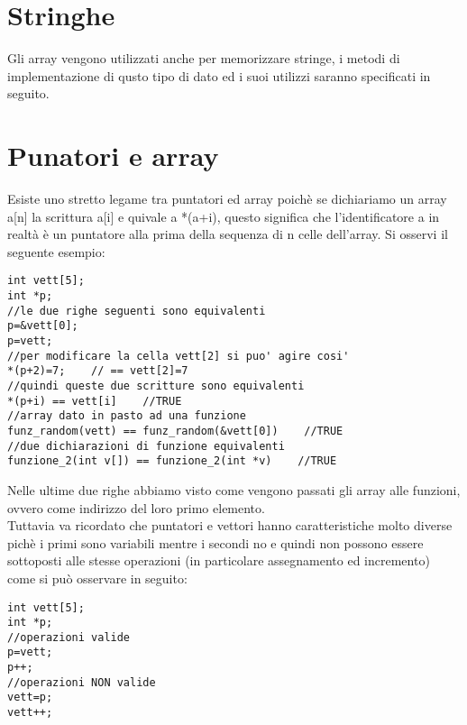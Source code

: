 \section{Stringhe}
Gli array vengono utilizzati anche per memorizzare stringe, i metodi di implementazione di qusto tipo di dato ed i suoi utilizzi saranno specificati in seguito.
\section{Punatori e array}
Esiste uno stretto legame tra puntatori ed array poichè se dichiariamo un array a[n] la scrittura a[i] e quivale a *(a+i), questo significa che l'identificatore a in realtà è un puntatore alla prima della sequenza di n celle dell'array. Si osservi il seguente esempio:
\begin{lstlisting}[title={Utilizzo di puntatori come array}]
int vett[5];
int *p;
//le due righe seguenti sono equivalenti
p=&vett[0]; 
p=vett;
//per modificare la cella vett[2] si puo' agire cosi'
*(p+2)=7;    // == vett[2]=7
//quindi queste due scritture sono equivalenti
*(p+i) == vett[i]    //TRUE
//array dato in pasto ad una funzione
funz_random(vett) == funz_random(&vett[0])    //TRUE
//due dichiarazioni di funzione equivalenti
funzione_2(int v[]) == funzione_2(int *v)    //TRUE
\end{lstlisting}
Nelle ultime due righe abbiamo visto come vengono passati gli array alle funzioni, ovvero come indirizzo del loro primo elemento.\\
Tuttavia va ricordato che puntatori e vettori hanno caratteristiche molto diverse pichè i primi sono variabili mentre i secondi no e quindi non possono essere sottoposti alle stesse operazioni (in particolare assegnamento ed incremento) come si può osservare in seguito:
\begin{lstlisting}[title={Differenze puntatori/array}]
int vett[5];
int *p;
//operazioni valide
p=vett;
p++;
//operazioni NON valide
vett=p;
vett++;
\end{lstlisting}
 
